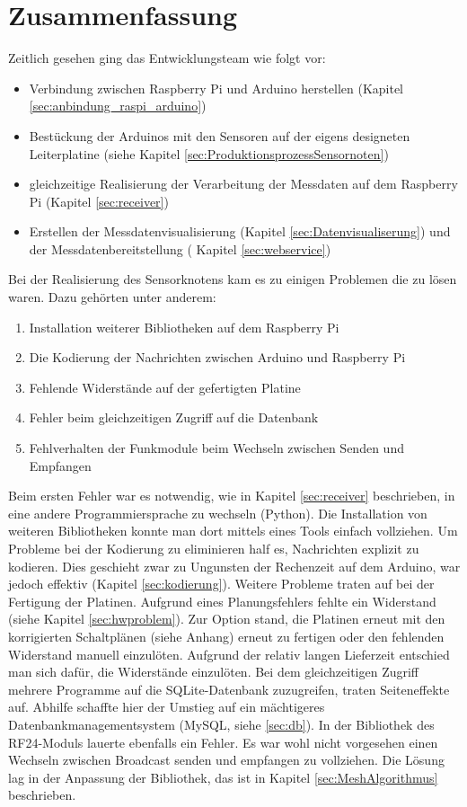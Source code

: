 \section{Zusammenfassung}
Zeitlich gesehen ging das Entwicklungsteam wie folgt vor:
\begin{itemize}
\item Verbindung zwischen Raspberry Pi und Arduino herstellen (Kapitel \ref{sec:anbindung_raspi_arduino})
\item Bestückung der Arduinos mit den Sensoren auf der eigens designeten Leiterplatine (siehe Kapitel \ref{sec:ProduktionsprozessSensornoten})
\item gleichzeitige Realisierung der Verarbeitung der Messdaten auf dem Raspberry Pi (Kapitel \ref{sec:receiver})
\item Erstellen der Messdatenvisualisierung (Kapitel \ref{sec:Datenvisualiserung}) und der Messdatenbereitstellung ( Kapitel \ref{sec:webservice}) 
\end{itemize}

Bei der Realisierung des Sensorknotens kam es zu einigen Problemen die zu lösen waren. Dazu gehörten unter anderem:
\begin{enumerate}
\item Installation weiterer Bibliotheken auf dem Raspberry Pi
\item Die Kodierung der Nachrichten zwischen Arduino und Raspberry Pi
\item Fehlende Widerstände auf der gefertigten Platine
\item Fehler beim gleichzeitigen Zugriff auf die Datenbank
\item Fehlverhalten der Funkmodule beim Wechseln zwischen Senden und Empfangen
\end{enumerate}

Beim ersten Fehler war es notwendig, wie in Kapitel  \ref{sec:receiver} beschrieben, in eine andere Programmiersprache zu wechseln (Python). Die Installation von weiteren Bibliotheken konnte man dort mittels eines Tools einfach vollziehen. 
Um Probleme bei der Kodierung zu eliminieren half es, Nachrichten explizit zu kodieren. Dies geschieht zwar zu Ungunsten der Rechenzeit auf dem Arduino, war jedoch effektiv (Kapitel \ref{sec:kodierung}). 
Weitere Probleme traten auf bei der Fertigung der Platinen. Aufgrund eines Planungsfehlers fehlte ein Widerstand (siehe Kapitel \ref{sec:hwproblem}). Zur Option stand, die Platinen erneut mit den korrigierten Schaltplänen (siehe Anhang) erneut zu fertigen oder den fehlenden Widerstand manuell einzulöten. Aufgrund der relativ langen Lieferzeit entschied man sich dafür, die Widerstände einzulöten.
Bei dem gleichzeitigen Zugriff mehrere Programme auf die SQLite-Datenbank zuzugreifen, traten Seiteneffekte auf. Abhilfe schaffte hier der Umstieg auf ein mächtigeres Datenbankmanagementsystem (MySQL, siehe \ref{sec:db}).
In der Bibliothek des RF24-Moduls lauerte ebenfalls ein Fehler. Es war wohl nicht vorgesehen einen Wechseln zwischen Broadcast senden und empfangen zu vollziehen. Die Lösung lag in der Anpassung der Bibliothek, das ist in Kapitel \ref{sec:MeshAlgorithmus} beschrieben.
